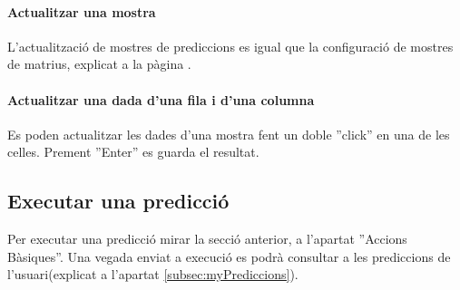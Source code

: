 \paragraph*{Actualitzar una mostra} L'actualització de mostres de prediccions es igual que la configuració de mostres de matrius, explicat a la p\`{a}gina \pageref{matrixConfiguration}.

\paragraph*{Actualitzar una dada d'una fila i d'una columna} Es poden actualitzar les dades d'una mostra fent un doble ''click'' en una de les celles. Prement ''Enter'' es guarda el resultat.

\subsection{Executar una predicció}
Per executar una predicció mirar la secció anterior, a l'apartat ''Accions Bàsiques''. Una vegada enviat a execució es podr\`{a} consultar a les prediccions de l'usuari(explicat a l'apartat \ref{subsec:myPrediccions}).

